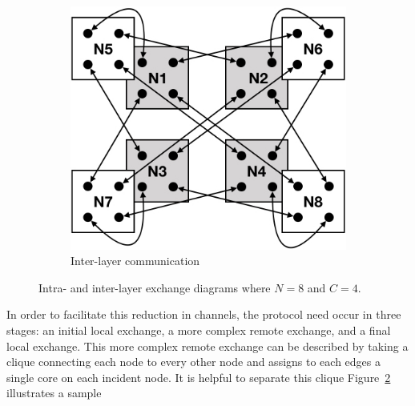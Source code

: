 \documentclass{report}
\begin{document}
\begin{figure}
\begin{center}
\begin{subfigure}{0.49\linewidth}
			\centerline{\includegraphics[width=1.0\columnwidth]{inter_layer_nlnr}}
			\caption{Inter-layer communication \label{fig:inter_exchange}}
		\end{subfigure}
		\caption{Intra- and inter-layer exchange diagrams where $N = 8$ and $C = 4$. \label{fig:nlnr}}
	\end{center}
\end{figure}


In order to facilitate this reduction in channels, the protocol need occur in three stages: an initial local exchange, a more complex remote exchange, and a final local exchange.
This more complex remote exchange can be described by taking a clique connecting each node to every other node and assigns to each edges a single core on each incident node.
It is helpful to separate this clique 
Figure~\ref{fig:nlnr} illustrates a sample
\end{document}
